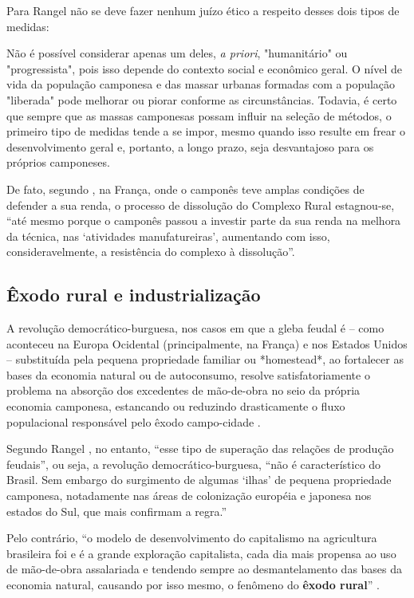 \documentclass[
	12pt,				%
	oneside,			%
	a4paper,			%
	chapter=TITLE,		%
	section=TITLE,		%
	english,			%
	brazil				%
	]{abntex2}
\begin{document}
\begin{refsection}
Para Rangel \autocite*[114]{rangel1954} não se deve fazer nenhum juízo ético a respeito
desses dois tipos de medidas:
\begin{citacao}
Não é possível considerar apenas um deles, \emph{a priori}, "humanitário" ou
"progressista", pois isso depende do contexto social e econômico geral. O nível 
de vida da população camponesa e das massar urbanas formadas com a população
"liberada" pode melhorar ou piorar conforme as circunstâncias. Todavia, é certo
que sempre que as massas camponesas possam influir na seleção de métodos, o 
primeiro tipo de medidas tende a se impor, mesmo quando isso resulte em frear
o desenvolvimento geral e, portanto, a longo prazo, seja desvantajoso para os
próprios camponeses.
\end{citacao}
De fato, segundo \textcite[p.~115]{rangel1954}, na França, onde o camponês teve amplas
condições de defender a sua renda, o processo de dissolução do Complexo Rural
estagnou-se, ``até mesmo porque o camponês passou a investir parte da sua renda
na melhora da técnica, nas `atividades manufatureiras', aumentando com isso,
consideravelmente, a resistência do complexo à dissolução''.

\hypertarget{uxeaxodo-rural-e-industrializauxe7uxe3o}{%
\subsection{Êxodo rural e industrialização}\label{uxeaxodo-rural-e-industrializauxe7uxe3o}}
\begin{citacao}
A revolução democrático-burguesa, nos casos em que a gleba feudal é -- como
aconteceu na Europa Ocidental (principalmente, na França) e nos Estados Unidos
-- substituída pela pequena propriedade familiar ou *homestead*, ao fortalecer
as bases da economia natural ou de autoconsumo, resolve satisfatoriamente o
problema na absorção dos excedentes de mão-de-obra no seio da própria economia
camponesa, estancando ou reduzindo drasticamente o fluxo populacional
responsável pelo êxodo campo-cidade \cite[p.~133]{rangel1986b}. 
\end{citacao}
Segundo Rangel \autocite*[133]{rangel1986b}, no entanto, ``esse tipo de superação das
relações de produção feudais'', ou seja, a revolução democrático-burguesa, ``não é
característico do Brasil. Sem embargo do surgimento de algumas `ilhas' de
pequena propriedade camponesa, notadamente nas áreas de colonização européia e
japonesa nos estados do Sul, que mais confirmam a regra.''

Pelo contrário, ``o modelo de desenvolvimento do capitalismo na agricultura
brasileira foi e é a grande exploração capitalista, cada dia mais propensa ao
uso de mão-de-obra assalariada e tendendo sempre ao desmantelamento das bases da
economia natural, causando por isso mesmo, o fenômeno do \textbf{êxodo rural}''
\autocite[134, grifo nosso]{rangel1986b}.


\end{refsection}
\end{document}
